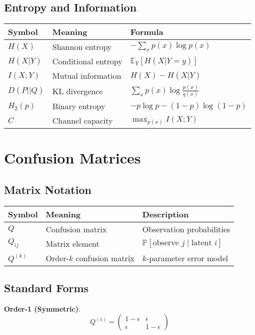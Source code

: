 \subsection{Entropy and Information}

\begin{tabular}{|l|l|l|}
\hline
\textbf{Symbol} & \textbf{Meaning} & \textbf{Formula} \\
\hline
$H(X)$ & Shannon entropy & $-\sum_x p(x) \log p(x)$ \\
$H(X|Y)$ & Conditional entropy & $\mathbb{E}_Y[H(X|Y=y)]$ \\
$I(X;Y)$ & Mutual information & $H(X) - H(X|Y)$ \\
$D(P||Q)$ & KL divergence & $\sum_x p(x) \log \frac{p(x)}{q(x)}$ \\
$H_2(p)$ & Binary entropy & $-p\log p - (1-p)\log(1-p)$ \\
$C$ & Channel capacity & $\max_{p(x)} I(X;Y)$ \\
\hline
\end{tabular}

\section{Confusion Matrices}

\subsection{Matrix Notation}

\begin{tabular}{|l|l|l|}
\hline
\textbf{Symbol} & \textbf{Meaning} & \textbf{Description} \\
\hline
$Q$ & Confusion matrix & Observation probabilities \\
$Q_{ij}$ & Matrix element & $\mathbb{P}[\text{observe } j \mid \text{latent } i]$ \\
$Q^{(k)}$ & Order-$k$ confusion matrix & $k$-parameter error model \\
\hline
\end{tabular}

\subsection{Standard Forms}

\textbf{Order-1 (Symmetric)}:
\begin{equation}
Q^{(1)} = \begin{pmatrix}
1-\epsilon & \epsilon \\
\epsilon & 1-\epsilon
\end{pmatrix}
\end{equation}

